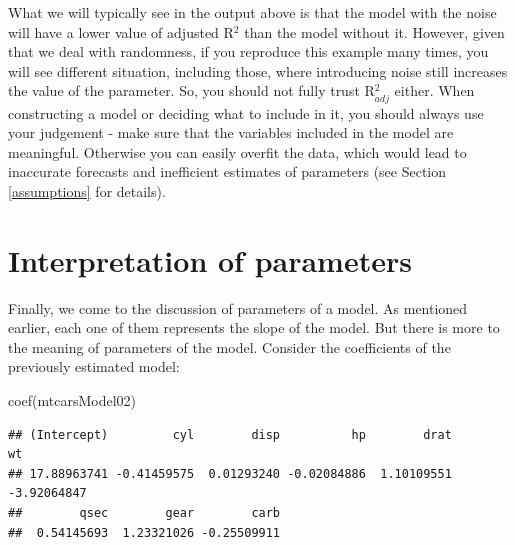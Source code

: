 \documentclass[
]{book}
\newenvironment{Shaded}{\begin{snugshade}}{\end{snugshade}}
\newcommand{\FunctionTok}[1]{\textcolor[rgb]{0.00,0.00,0.00}{#1}}
\newcommand{\NormalTok}[1]{#1}
\theoremstyle{definition}
\theoremstyle{definition}
\theoremstyle{definition}
\theoremstyle{definition}
\theoremstyle{remark}
\begin{document}
What we will typically see in the output above is that the model with the noise will have a lower value of adjusted R\(^2\) than the model without it. However, given that we deal with randomness, if you reproduce this example many times, you will see different situation, including those, where introducing noise still increases the value of the parameter. So, you should not fully trust R\(^2_{adj}\) either. When constructing a model or deciding what to include in it, you should always use your judgement - make sure that the variables included in the model are meaningful. Otherwise you can easily overfit the data, which would lead to inaccurate forecasts and inefficient estimates of parameters (see Section \ref{assumptions} for details).

\hypertarget{interpretation-of-parameters}{%
\section{Interpretation of parameters}\label{interpretation-of-parameters}}

Finally, we come to the discussion of parameters of a model. As mentioned earlier, each one of them represents the slope of the model. But there is more to the meaning of parameters of the model. Consider the coefficients of the previously estimated model:

\begin{Shaded}
\begin{Highlighting}[]
\FunctionTok{coef}\NormalTok{(mtcarsModel02)}
\end{Highlighting}
\end{Shaded}

\begin{verbatim}
## (Intercept)         cyl        disp          hp        drat          wt 
## 17.88963741 -0.41459575  0.01293240 -0.02084886  1.10109551 -3.92064847 
##        qsec        gear        carb 
##  0.54145693  1.23321026 -0.25509911
\end{verbatim}
\end{document}
